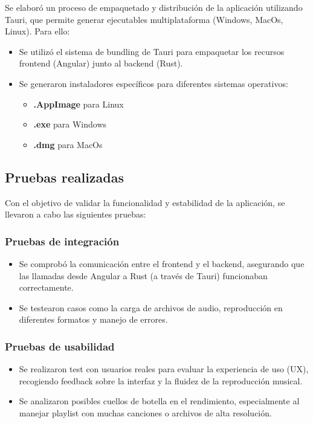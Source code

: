 \documentclass[11pt, a4paper]{article}
\begin{document}
        Se elaboró un proceso de empaquetado y distribución de la aplicación utilizando Tauri, que permite generar ejecutables multiplataforma (Windows, MacOs, Linux). Para ello:

        \begin{itemize}
            \item Se utilizó el sistema de bundling de Tauri para empaquetar los recursos frontend (Angular) junto al backend (Rust).
            \item Se generaron instaladores específicos para diferentes sistemas operativos: \begin{itemize}
                \item \textbf{.AppImage} para Linux
                \item \textbf{.exe} para Windows
                \item \textbf{.dmg} para MacOs
                \end{itemize}
        \end{itemize}

        \subsection{Pruebas realizadas}

        Con el objetivo de validar la funcionalidad y estabilidad de la aplicación, se llevaron a cabo las siguientes pruebas:

            \subsubsection{Pruebas de integración}

            \begin{itemize}
                \item Se comprobó la comunicación entre el frontend y el backend, asegurando que las llamadas desde Angular a Rust (a través de Tauri) funcionaban correctamente.
                \item Se testearon casos como la carga de archivos de audio, reproducción en diferentes formatos y manejo de errores.
            \end{itemize}

            \subsubsection{Pruebas de usabilidad}

            \begin{itemize}
                \item Se realizaron test con usuarios reales para evaluar la experiencia de uso (UX), recogiendo feedback sobre la interfaz y la fluidez de la reproducción musical.
                \item Se analizaron posibles cuellos de botella en el rendimiento, especialmente al manejar playlist con muchas canciones o archivos de alta resolución.
            \end{itemize}
\end{document}
